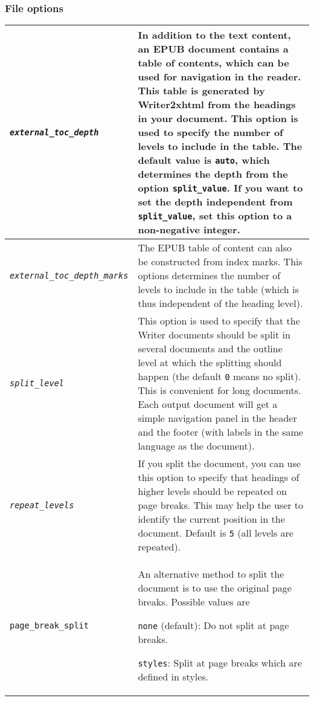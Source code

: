 \documentclass{article}
\newcommand\textstyleSourceText[1]{\texttt{\textmd{#1}}}
\begin{document}
\subsubsection[File options]{File options}
\begin{center}
\begin{tabular}{|m{5.991cm}|m{10.621cm}|}

\hline
{\mdseries \textstyleSourceText{\emph{external\_toc\_depth}}} &
{\mdseries In addition to the text content, an EPUB document contains a table of contents, which can be used for navigation in the reader. This table is generated by Writer2xhtml from the headings in your document. This option is used to specify the number of levels to include in the table. The default value is \textstyleSourceText{auto}, which determines the depth from the option \textstyleSourceText{split\_value}. If you want to set the depth independent from \textstyleSourceText{split\_value}, set this option to a non-negative integer.}\\\hline
\textstyleSourceText{\emph{external\_toc\_depth\_marks}} &
The EPUB table of content can also be constructed from index marks. This options determines the number of levels to include in the table (which is thus independent of the heading level).\\\hline
{\mdseries \textstyleSourceText{\emph{split\_level}}} &
{\mdseries This option is used to specify that the Writer documents should be split in several documents and the outline level at which the splitting should happen (the default \textstyleSourceText{0} means no split). This is convenient for long documents. Each output document will get a simple navigation panel in the header and the footer (with labels in the same language as the document).}\\\hline
{\mdseries \textstyleSourceText{\emph{repeat\_levels}}} &
{\mdseries If you split the document, you can use this option to specify that headings of higher levels should be repeated on page breaks. This may help the user to identify the current position in the document. Default is \textstyleSourceText{5} (all levels are repeated).}\\\hline
{\mdseries \textstyleSourceText{page\_break\_split}} &
{\mdseries An alternative method to split the document is to use the original page breaks. Possible values are}

{\mdseries \textstyleSourceText{none} (default): Do not split at page breaks.}

{\mdseries \textstyleSourceText{styles}: Split at page breaks which are defined in styles.}


\end{tabular}
\end{center}
\end{document}
